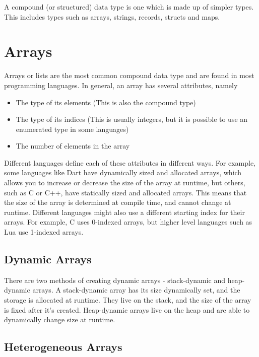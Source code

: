 
A compound (or structured) data type is one which is made up of simpler types. This includes types such as arrays,
 strings, records, structs and maps.

\section*{Arrays}

Arrays or lists are the most common compound data type and are found in most programming languages. In general, an array
 has several attributes, namely
\begin{itemize}
  \item The type of its elements (This is also the compound type)
  \item The type of its indices (This is usually integers, but it is possible to use an enumerated type in some languages)
  \item The number of elements in the array
\end{itemize}

Different languages define each of these attributes in different ways. For example, some languages like Dart have
 dynamically sized and allocated arrays, which allows you to increase or decrease the size of the array at runtime, but
 others, such as C or C++, have statically sized and allocated arrays. This means that the size of the array is determined
 at compile time, and cannot change at runtime. Different languages might also use a different starting index for their
 arrays. For example, C uses 0-indexed arrays, but higher level languages such as Lua use 1-indexed arrays.

\subsection*{Dynamic Arrays}

There are two methods of creating dynamic arrays - stack-dynamic and heap-dynamic arrays. A stack-dynamic array has its
 size dynamically set, and the storage is allocated at runtime. They live on the stack, and the size of the array is
 fixed after it's created. Heap-dynamic arrays live on the heap and are able to dynamically change size at runtime.

\subsection*{Heterogeneous Arrays}

